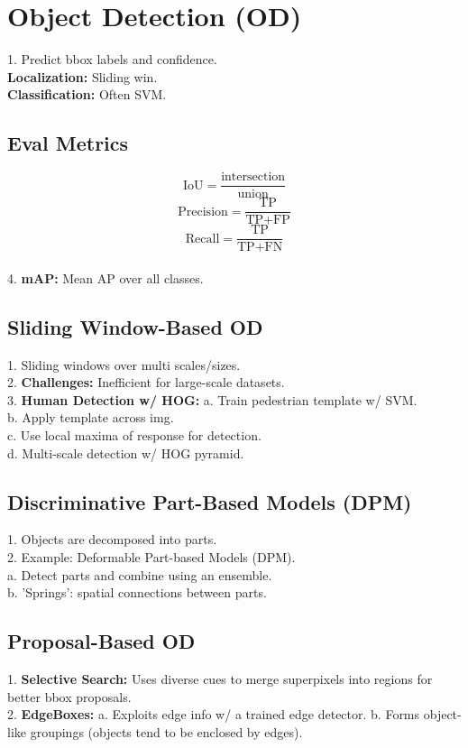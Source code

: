 \section{Object Detection (OD)}
1. Predict bbox labels and confidence. \\ 
\textbf{Localization:} Sliding win.  \\
\textbf{Classification:} Often SVM.

\subsection{Eval Metrics}
\[
   \text{IoU} = \frac{\text{intersection}}{\text{union}}
   \] 
\[
   \text{Precision} = \frac{\text{TP}}{\text{TP} + \text{FP}}
   \] 
\[
   \text{Recall} = \frac{\text{TP}}{\text{TP} + \text{FN}}
   \]  \\
4. \textbf{mAP:} Mean AP over all classes.

\subsection{Sliding Window-Based OD}
1. Sliding windows over multi scales/sizes.  \\
2. \textbf{Challenges:} Inefficient for large-scale datasets.  \\
3. \textbf{Human Detection w/ HOG:}  
   a. Train pedestrian template w/ SVM.  \\
   b. Apply template across img.  \\
   c. Use local maxima of response for detection.  \\
   d. Multi-scale detection w/ HOG pyramid.

\subsection{Discriminative Part-Based Models (DPM)}
1. Objects are decomposed into parts.  \\
2. Example: Deformable Part-based Models (DPM).  \\
   a. Detect parts and combine using an ensemble.  \\
   b. 'Springs': spatial connections between parts.\\

\subsection{Proposal-Based OD}
1. \textbf{Selective Search:}  
   Uses diverse cues to merge superpixels into regions for better bbox proposals.  \\
2. \textbf{EdgeBoxes:}  
   a. Exploits edge info w/ a trained edge detector.  
   b. Forms object-like groupings (objects tend to be enclosed by edges).

